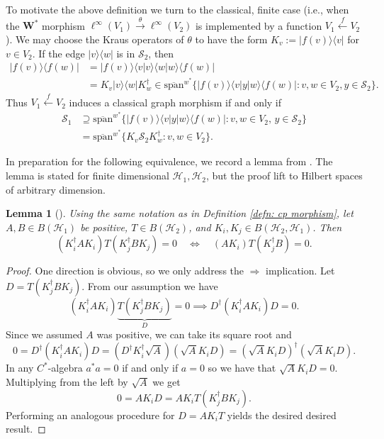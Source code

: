 \documentclass[12pt]{article}
\newtheorem{lemma}[theorem]{Lemma}
\theoremstyle{definition}
\newenvironment{example}
  {\pushQED{\qed}\renewcommand{\qedsymbol}{\textcircled{\tiny E}}\examplex}
  {\popQED\endexamplex}
\newcommand{\Span}{\text{span}}
\newcommand{\mc}[1]{\mathcal{#1}}
\newcommand{\<}{\langle}
\renewcommand{\>}{\rangle}
\begin{document}
\begin{example}
    To motivate the above definition we turn to the classical, finite case (i.e., when the $\mathbf{W^*}$ morphism $\ell^\infty(V_1) \overset{\theta}{\to} \ell^\infty(V_2)$ is implemented by a function $V_1 \overset{f}{\leftarrow} V_2$). We may choose the Kraus operators of $\theta$ to have the form $K_v :=|f(v)\>\<v|$ for $v \in V_2$. If the edge $|v\>\<w|$ is in $\mc S_2$, then 
    \begin{align*}
    |f(v)\>\<f(w)| &=  |f(v)\>\<v| v\>\<w|w\>\<f(w)| \\
    &= K_v|v\>\<w|K_w^\dagger \in \overline{\Span}^{w^*}\{|f(v)\>\<v| y|w\>\<f(w)| : v,w \in V_2, y \in \mc S_2\}.
    \end{align*}
    Thus $V_1 \overset{f}{\leftarrow} V_2$ induces a classical graph morphism if and only if 
    \begin{align*}
    \mc S_1 &\supseteq \overline{\Span}^{w^*}\{|f(v)\>\<v| y|w\>\<f(w)| : v,w \in V_2, \, y \in \mc S_2\} \\
    &= \overline{\Span}^{w^*}\{ K_v \mc S_2 K_w^\dagger: v,w \in V_2 \}.
    \end{align*}
\end{example}

In preparation for the following equivalence, we record a lemma from \cite{weavergraphsrelations}. The lemma is stated for finite dimensional $\mc H_1, \mc H_2$, but the proof lift to Hilbert spaces of arbitrary dimension. 

\begin{lemma}[] \label{lemma: positivity-weaver}
Using the same notation as in Definition \ref{defn: cp morphism}, let $A,B \in B(\mc H_1)$ be positive, $T \in B(\mc H_2)$, and $K_i, K_j \in B(\mc H_2,\mc H_1)$. Then
            \[
            (K_i^\dagger A K_i )T (K_j^\dagger B K_j) =0 \quad \iff \quad (AK_i )T (K_j^\dagger B) =0.
            \]
\end{lemma}
\begin{proof}
    One direction is obvious, so we only address the $\Rightarrow$ implication. Let $D = T (K_j^\dagger B K_j)$. From our assumption we have 
    \[
    (K_i^\dagger A K_i )\underbrace{T (K_j^\dagger B K_j)}_{D} =0 \implies D^\dagger(K_i^\dagger AK_i) D = 0.
    \]
    Since we assumed $A$ was positive, we can take its square root and
    \[
    0 = D^\dagger(K_i^\dagger AK_i) D = (D^\dagger K_i^\dagger \sqrt{A} )(\sqrt{A} K_i D ) = (\sqrt{A} K_i D )^\dagger (\sqrt{A} K_i D ).
    \]
    In any $C^*$-algebra $a^* a = 0$ if and only if $a =0$ so we have that $\sqrt{A} K_i D =0$. Multiplying from the left by $\sqrt{A}$ we get 
    \[
    0 = A K_i D = A K_i T (K_j^\dagger B K_j).
    \]
    Performing an analogous procedure for $D = AK_i T$ yields the desired desired result.
\end{proof}
\end{document}
